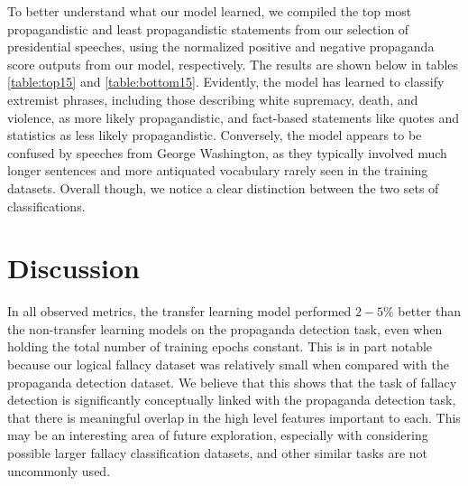 \documentclass[conference]{IEEEtran}
\begin{document}
To better understand what our model learned, we compiled the top most propagandistic and least propagandistic statements from our selection of presidential speeches, using the normalized positive and negative propaganda score outputs from our model, respectively. The results are shown below in tables \ref{table:top15} and \ref{table:bottom15}. Evidently, the model has learned to classify extremist phrases, including those describing white supremacy, death, and violence, as more likely propagandistic, and fact-based statements like quotes and statistics as less likely propagandistic. Conversely, the model appears to be confused by speeches from George Washington, as they typically involved much longer sentences and more antiquated vocabulary rarely seen in the training datasets. Overall though, we notice a clear distinction between the two sets of classifications.

\section{Discussion}

In all observed metrics, the transfer learning model performed $2-5\%$ better than the non-transfer learning models on the propaganda detection task, even when holding the total number of training epochs constant. This is in part notable because our logical fallacy dataset was relatively small when compared with the propaganda detection dataset. We believe that this shows that the task of fallacy detection is significantly conceptually linked with the propaganda detection task, that there is meaningful overlap in the high level features important to each. This may be an interesting area of future exploration, especially with considering possible larger fallacy classification datasets, and other similar tasks are not uncommonly used. 
\end{document}
